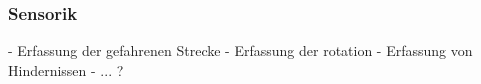 \documentclass[main.tex]{subfiles} %
\begin{document}

\subsubsection{Sensorik}

- Erfassung der gefahrenen Strecke
- Erfassung der rotation
- Erfassung von Hindernissen
- ... ? 
\end{document}
